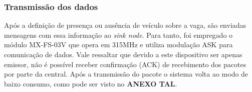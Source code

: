 \documentclass[oneside,openright,12pt]{ufsm_2015} %
\begin{document}
    \subsubsection{Transmissão dos dados}
    Após a definição de presença ou ausência de veículo sobre a vaga, são enviadas mensagens com essa informação ao \textit{sink node}. Para tanto, foi empregado o módulo MX-FS-03V que opera em 315MHz e utiliza modulação ASK para comunicação de dados. Vale ressaltar que devido a este dispositivo ser apenas emissor, não é possível receber confirmação (ACK) de recebimento dos pacotes por parte da central. Após a transmissão do pacote o sistema volta ao modo de baixo consumo, como pode ser visto no \textbf{ANEXO TAL}.
    
    
    
\end{document}

